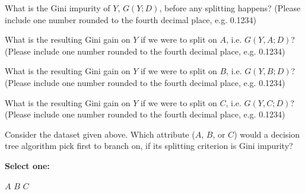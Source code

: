 \begin{questions}
    \question[1] What is the Gini impurity of $Y$, $G(Y;D)$, before any splitting happens?
    (Please include one number rounded to the fourth decimal place, e.g. 0.1234)
    
    \begin{tcolorbox}[fit,height=1cm, width=2cm, blank, borderline={1pt}{-2pt},nobeforeafter]
    \end{tcolorbox}
    
    
    
    \question[1] What is the resulting Gini gain on $Y$ if we were to split on $A$, i.e. $G(Y,A;D)$?
    (Please include one number rounded to the fourth decimal place, e.g. 0.1234)
    
    \begin{tcolorbox}[fit,height=1cm, width=2cm, blank, borderline={1pt}{-2pt},nobeforeafter]
    \end{tcolorbox}
    
    

    \question[1] What is the resulting Gini gain on $Y$ if we were to split on $B$, i.e. $G(Y,B;D)$?
    (Please include one number rounded to the fourth decimal place, e.g. 0.1234)
    
    \begin{tcolorbox}[fit,height=1cm, width=2cm, blank, borderline={1pt}{-2pt},nobeforeafter]
    \end{tcolorbox}
    
    
    
    \question[1] What is the resulting Gini gain on $Y$ if we were to split on $C$, i.e. $G(Y,C;D)$?
    (Please include one number rounded to the fourth decimal place, e.g. 0.1234)
    
    \begin{tcolorbox}[fit,height=1cm, width=2cm, blank, borderline={1pt}{-2pt},nobeforeafter]
    \end{tcolorbox}
    
    
    
   \question[1] Consider the dataset given above. Which attribute ($A$, $B$, or $C$) would a decision tree algorithm pick first to branch on, if its splitting criterion is Gini impurity?
    
    \textbf{Select one:}
    \begin{checkboxes}
        \choice $A$
        \choice $B$
        \choice $C$
    \end{checkboxes}
    

\end{questions}

